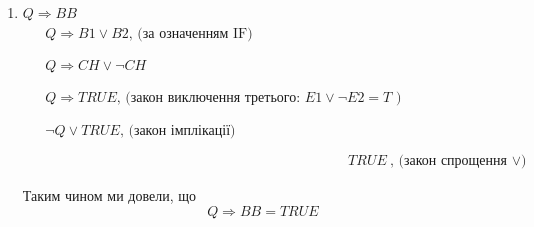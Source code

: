 \documentclass[14pt,a4paper]{extarticle}
\theoremstyle{definition}
\begin{document}
\begin{enumerate}
  \item $Q \Rightarrow BB$
  \begin{align*}
    \begin{split}
      &Q \Rightarrow B1 \lor B2 \text{, (за означенням IF)} \\
    \end{split}\\
    \begin{split}
      &Q \Rightarrow CH \lor \lnot CH \\
    \end{split}\\
    \begin{split}
      &Q \Rightarrow TRUE
      \text{, (закон виключення третього: }E1 \lor \lnot E2 = T\text{ )} \\
    \end{split}\\
    \begin{split}
      &\lnot Q \lor TRUE
      \text{, (закон імплікації)} \\
    \end{split}\\
    &TRUE\text{, (закон спрощення $\lor$)}
  \end{align*}

  Таким чином ми довели, що
  \begin{equation}
    Q \Rightarrow BB = TRUE
  \end{equation}


\end{enumerate}
\end{document}
